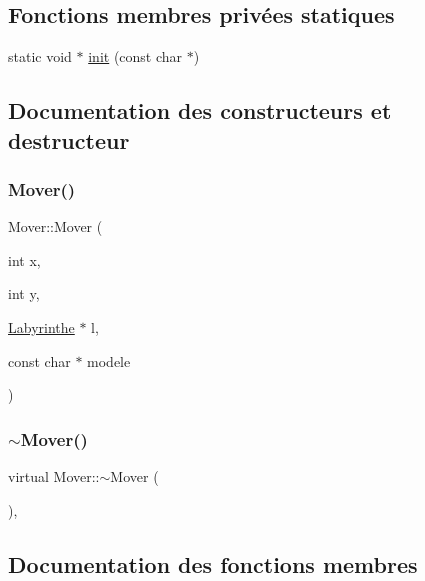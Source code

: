 \subsection*{Fonctions membres privées statiques}
\begin{DoxyCompactItemize}
\item 
static void $\ast$ \hyperlink{classMover_a838ebd14a8a3f2a561ac3df0841f7a29}{init} (const char $\ast$)
\end{DoxyCompactItemize}


\subsection{Documentation des constructeurs et destructeur}
\mbox{\label{classMover_a19c916be0b9f7d6beda92bb04aa338bb}} 
\subsubsection{\texorpdfstring{Mover()}{Mover()}}
{\footnotesize\ttfamily Mover\+::\+Mover (\begin{DoxyParamCaption}\item[{int}]{x,  }\item[{int}]{y,  }\item[{\hyperlink{classLabyrinthe}{Labyrinthe} $\ast$}]{l,  }\item[{const char $\ast$}]{modele }\end{DoxyParamCaption})\hspace{0.3cm}{\ttfamily [inline]}}

\mbox{\label{classMover_a906ab777eb5f6e49a85e3758aca9e913}} 
\subsubsection{\texorpdfstring{$\sim$\+Mover()}{~Mover()}}
{\footnotesize\ttfamily virtual Mover\+::$\sim$\+Mover (\begin{DoxyParamCaption}{ }\end{DoxyParamCaption})\hspace{0.3cm}{\ttfamily [inline]}, {\ttfamily [virtual]}}



\subsection{Documentation des fonctions membres}
\mbox{\label{classMover_a670fb72f8e496de3420b89c84def7418}} 
